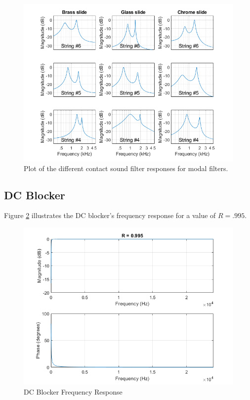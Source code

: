 \documentclass[../main.tex]{subfiles}
\begin{document}
\begin{figure}[h]
    \centering
    \includegraphics[scale=.65]{./images/plots/LongitudinalModeFiltersRecreation.png}
    \caption{Plot of the different contact sound filter responses for modal filters.}
    \label{fig:LongModeRecr}
\end{figure}

\clearpage

\subsection{DC Blocker}
Figure \ref{fig:DCBlockerResponse} illustrates the DC blocker's frequency response for a value of $R = .995$.

\begin{figure}[h]
    \centering
    \includegraphics[scale=.65]{./images/plots/DCBlockerResponse.png}
    \caption{DC Blocker Frequency Response}
    \label{fig:DCBlockerResponse}
\end{figure}
\end{document}
